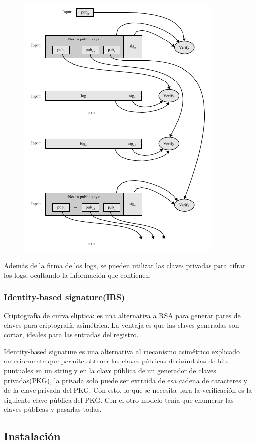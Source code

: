 \begin{figure}[H]
\centering
\includegraphics[scale=0.4]{imagenes/PublicKeyVerification.png}
\end{figure}
  
Además de la firma de los logs, se pueden utilizar las claves privadas para cifrar los logs, ocultando la información que contienen.
\subsubsection{Identity-based signature(IBS)}
Criptografía de curva elíptica: es una alternativa a RSA para generar pares de claves para criptografía asimétrica. La ventaja es que las claves generadas son cortar, ideales para las entradas del registro.

Identity-based signature es una alternativa al mecanismo asimétrico explicado anteriormente que permite obtener las claves públicas derivándolas de bits puntuales en un string y en la clave pública de un generador de claves privadas(PKG), la privada solo puede ser extraída de esa cadena de caracteres y de la clave privada del PKG. Con esto, lo que se necesita para la verificación es la siguiente clave pública del PKG. Con el otro modelo tenía que enumerar las claves públicas y pasarlas todas.
\subsection{Instalación}
